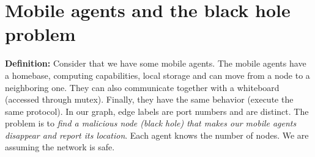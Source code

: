 \documentclass[paper=a4, fontsize=11pt]{scrartcl} %
\numberwithin{equation}{section} %
\numberwithin{figure}{section} %
\numberwithin{table}{section} %
\begin{document}
\newpage

\section*{Mobile agents and the black hole problem}
\textbf{Definition:} Consider that we have some mobile agents. The mobile agents have a homebase, computing capabilities, local storage and can move from a node to a neighboring one. They can also communicate together with a whiteboard (accessed through mutex). Finally, they have the same behavior (execute the same protocol). In our graph, edge labels are port numbers and are distinct. The problem is to \textit{find a malicious node (black hole) that makes our mobile agents disappear and report its location}. Each agent knows the number of nodes. We are assuming the network is safe.\\
\end{document}
